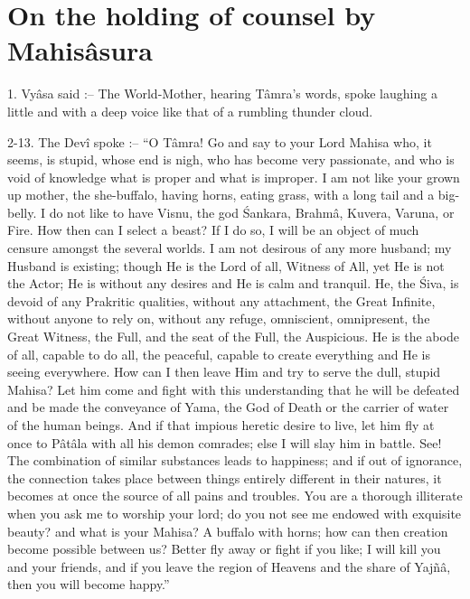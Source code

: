 ﻿\chapter{On the holding of counsel by Mahis\^asura}

1. Vy\^asa said :-- The World-Mother, hearing T\^amra's words, spoke laughing a little and with a deep voice like that of a rumbling thunder cloud.

2-13. The Dev\^i spoke :-- ``O T\^amra! Go and say to your Lord Mahisa who, it seems, is stupid, whose end is nigh, who has become very passionate, and who is void of knowledge what is proper and what is improper. I am not like your grown up mother, the she-buffalo, having horns, eating grass, with a long tail and a big-belly. I do not like to have Visnu, the god \'Sankara, Brahm\^a, Kuvera, Varuna, or Fire. How then can I select a beast? If I do so, I will be an object of much censure amongst the several worlds. I am not desirous of any more husband; my Husband is existing; though He is the Lord of all, Witness of All, yet He is not the Actor; He is without any desires and He is calm and tranquil. He, the \'Siva, is devoid of any Prakritic qualities, without any attachment, the Great Infinite, without anyone to rely on, without any refuge, omniscient, omnipresent, the Great Witness, the Full, and the seat of the Full, the Auspicious. He is the abode of all, capable to do all, the peaceful, capable to create everything and He is seeing everywhere. How can I then leave Him and try to serve the dull, stupid Mahisa? Let him come and fight with this understanding that he will be defeated and be made the conveyance of Yama, the God of Death or the carrier of water of the human beings. And if that impious heretic desire to live, let him fly at once to P\^at\^ala with all his demon comrades; else I will slay him in battle. See! The combination of similar substances leads to happiness; and if out of ignorance, the connection takes place between things entirely different in their natures, it becomes at once the source of all pains and troubles. You are a thorough illiterate when you ask me to worship your lord; do you not see me endowed with exquisite beauty? and what is your Mahisa? A buffalo with horns; how can then creation become possible between us? Better fly away or fight if you like; I will kill you and your friends, and if you leave the region of Heavens and the share of Yajñ\^a, then you will become happy.''

